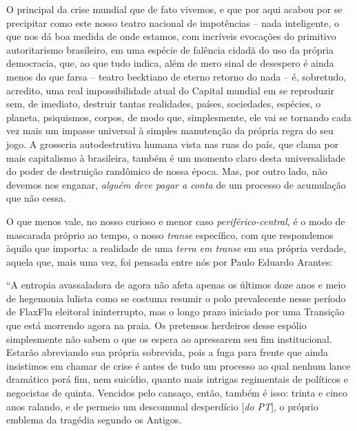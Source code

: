 O principal da crise mundial que de fato vivemos, e que por aqui acabou
por se precipitar como este nosso teatro nacional de impotências -- nada
inteligente, o que nos dá boa medida de onde estamos, com incríveis
evocações do primitivo autoritarismo brasileiro, em uma espécie de
falência cidadã do uso da própria democracia, que, ao que tudo indica,
além de mero sinal de desespero é ainda menos do que farsa -- teatro
becktiano de eterno retorno do nada -- é, sobretudo, acredito, uma real
impossibilidade atual do Capital mundial em se reproduzir sem, de
imediato, destruir tantas realidades, países, sociedades, espécies, o
planeta, psiquismos, corpos, de modo que, simplesmente, ele vai se
tornando cada vez mais um impasse universal à simples manutenção da
própria regra do seu jogo. A grosseria autodestrutiva humana vista nas
ruas do país, que clama por mais capitalismo à brasileira, também é um
momento claro desta universalidade do poder de destruição randômico de
nossa época. Mas, por outro lado, não devemos nos enganar, \emph{alguém
deve pagar a conta} de um processo de acumulação que não cessa.

O que menos vale, no nosso curioso e menor caso
\emph{periférico-central}, é o modo de mascarada próprio ao tempo, o
nosso \emph{transe} específico, com que respondemos àquilo que importa:
a realidade de uma \emph{terra em transe} em sua própria verdade, aquela
que, mais uma vez, foi pensada entre nós por Paulo Eduardo Arantes:

``A entropia avassaladora de agora não afeta apenas os últimos doze anos
e meio de hegemonia lulista como se costuma resumir o polo prevalecente
nesse período de FlaxFlu eleitoral ininterrupto, mas o longo prazo
iniciado por uma Transição que está morrendo agora na praia. Os
pretensos herdeiros desse espólio simplesmente não sabem o que os espera
ao apressarem seu fim institucional. Estarão abreviando sua própria
sobrevida, pois a fuga para frente que ainda insistimos em chamar de
crise é antes de tudo um processo ao qual nenhum lance dramático porá
fim, nem suicídio, quanto mais intrigas regimentais de políticos e
negocistas de quinta. Vencidos pelo cansaço, então, também é isso:
trinta e cinco anos ralando, e de permeio um descomunal desperdício
{[}\emph{do PT}{]}, o próprio emblema da tragédia segundo os Antigos.

